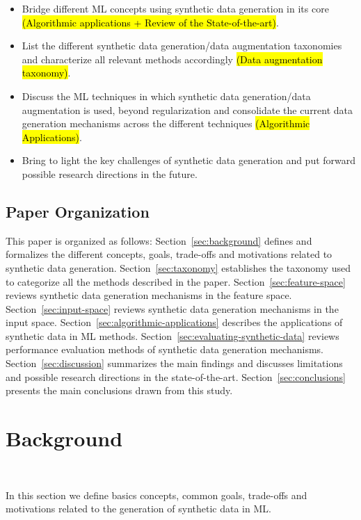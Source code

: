 \documentclass[parskip=full]{scrartcl}
\begin{document}
\begin{itemize}
    \item Bridge different ML concepts using synthetic data generation in its
        core \hl{(Algorithmic applications + Review of the State-of-the-art)}.
    \item List the different synthetic data generation/data augmentation
        taxonomies and characterize all relevant methods accordingly \hl{(Data
        augmentation taxonomy)}.
    \item Discuss the ML techniques in which synthetic data generation/data
        augmentation is used, beyond regularization and consolidate the
        current data generation mechanisms across the different techniques
        \hl{(Algorithmic Applications)}.
    \item Bring to light the key challenges of synthetic data generation and
        put forward possible research directions in the future.
\end{itemize}



\subsection{Paper Organization}

This paper is organized as follows: Section~\ref{sec:background} defines and
formalizes the different concepts, goals, trade-offs and motivations related
to synthetic data generation. Section~\ref{sec:taxonomy} establishes the
taxonomy used to categorize all the methods described in the paper.
Section~\ref{sec:feature-space} reviews synthetic data generation
mechanisms in the feature space. Section~\ref{sec:input-space}
reviews synthetic data generation mechanisms in the input space.
Section~\ref{sec:algorithmic-applications} describes the applications of
synthetic data in ML methods. Section~\ref{sec:evaluating-synthetic-data}
reviews performance evaluation methods of synthetic data generation
mechanisms. Section~\ref{sec:discussion} summarizes the main findings and
discusses limitations and possible research directions in the
state-of-the-art. Section~\ref{sec:conclusions} presents the main conclusions
drawn from this study.

\section{Background}~\label{sec:background}

In this section we define basics concepts, common goals, trade-offs and
motivations related to the generation of synthetic data in ML\@.
\end{document}
